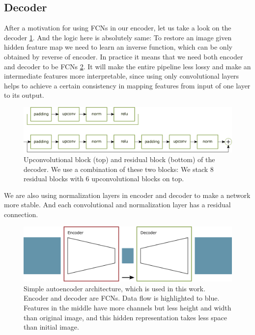 \subsection{Decoder}

After a motivation for using FCNs in our encoder, let us take a look on the decoder \ref{decoder}. And the logic here is absolutely same: To restore an image given hidden feature map we need to learn an inverse function, which can be only obtained by reverse of encoder. In practice it means that we need both encoder and decoder to be FCNs \ref{autoencoder}. It will make the entire pipeline less lossy and make an intermediate features more interpretable, since using only convolutional layers helps to achieve a certain consistency in mapping features from input of one layer to its output.

\begin{figure}[!ht]
    \centering
    \includegraphics[width=\textwidth]{figure/generator.png}
    \caption{Upconvolutional block (top) and residual block (bottom) of the decoder. We use a combination of these two blocks: We stack 8 residual blocks with 6 upconvolutional blocks on top.}
    \label{decoder}
\end{figure}

We are also using normalization layers in encoder and decoder to make a network more stable. And each convolutional and normalization layer has a residual connection.

\begin{figure}[!ht]
    \centering
    \includegraphics[width=\textwidth]{figure/general-autoencoder.png}
    \caption{Simple autoencoder architecture, which is used in this work. Encoder and decoder are FCNs. Data flow is highlighted to blue. Features in the middle have more channels but less height and width than original image, and this hidden representation takes less space than initial image.}
    \label{autoencoder}
\end{figure}

